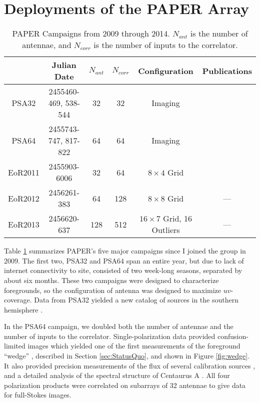 \section{Deployments of the PAPER Array}\label{sec:deploy}

\begin{table}\begin{center}
  \begin{tabular}{ c || c c c c c}
    & Julian Date & $N_{ant}$ & $N_{corr}$ & Configuration & Publications \\
    \hline\hline
    PSA32   & 2455460-469, 538-544 &  32 &  32 & Imaging                       & \cite{Jacobs2011} \\
    PSA64   & 2455743-747, 817-822 &  64 &  64 & Imaging                       & \cite{Jacobs2013b, Pober2013, Stefan2013} \\
    EoR2011 & 2455903-6006         &  32 &  64 & $8\times4$ Grid               & \cite{Jacobs2014, Moore2014, Parsons2014} \\
    EoR2012 & 2456261-383          &  64 & 128 & $8\times8$ Grid               & --- \\
    EoR2013 & 2456620-637          & 128 & 512 & $16\times7$ Grid, 16 Outliers & --- \\
  \end{tabular}
  \caption[PAPER campaigns]{\label{tab:deploy} PAPER Campaigns from 2009 through 2014. $N_{ant}$ is
  the number of antennae, and $N_{corr}$ is the number of inputs to the correlator.}
\end{center}\end{table}

Table \ref{tab:deploy} summarizes PAPER's five major campaigns since I joined the group in
2009. The first two, PSA32 and PSA64 span an entire year, but due to lack of internet connectivity
to site, consisted of two week-long seasons, separated by about six months. These two campaigns were
designed to characterize foregrounds, so the configuration of antenna was designed to maximize
$uv$-coverage. Data from PSA32 yielded a new catalog of sources in the southern hemisphere
\cite{Jacobs2011}. 

In the PSA64 campaign, we doubled both the number of antennae and the number of
inputs to the correlator. Single-polarization data provided confusion-limited images which yielded
one of the first measurements of the foreground ``wedge'' \cite{Pober2013}, described in Section \ref{sec:StatusQuo},
and shown in Figure \ref{fig:wedge}. It also provided precision measurements of the flux of several calibration sources \cite{Jacobs2013b}, and a detailed analysis of the spectral structure of Centaurus A
\cite{Stefan2013}. All four polarization products were correlated on subarrays of 32 antennae to
give data for full-Stokes images.

